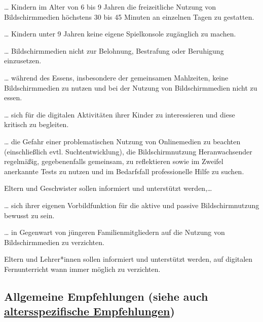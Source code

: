 \documentclass[
  letterpaper,
  DIV=11]{scrartcl}
\begin{document}
\ldots{} Kindern im Alter von 6 bis 9 Jahren die freizeitliche Nutzung
von Bildschirmmedien höchstens 30 bis 45 Minuten an einzelnen Tagen zu
gestatten.

\ldots{} Kindern unter 9 Jahren keine eigene Spielkonsole zugänglich zu
machen.

\ldots{} Bildschirmmedien nicht zur Belohnung, Bestrafung oder
Beruhigung einzusetzen.

\ldots{} während des Essens, insbesondere der gemeinsamen Mahlzeiten,
keine Bildschirmmedien zu nutzen und bei der Nutzung von
Bildschirmmedien nicht zu essen.

\ldots{} sich für die digitalen Aktivitäten ihrer Kinder zu
interessieren und diese kritisch zu begleiten.

\ldots{} die Gefahr einer problematischen Nutzung von Onlinemedien zu
beachten (einschließlich evtl. Suchtentwicklung), die Bildschirmnutzung
Heranwachsender regelmäßig, gegebenenfalls gemeinsam, zu reflektieren
sowie im Zweifel anerkannte Tests zu nutzen und im Bedarfsfall
professionelle Hilfe zu suchen.

Eltern und Geschwister sollen informiert und unterstützt werden,\ldots{}

\ldots{} sich ihrer eigenen Vorbildfunktion für die aktive und passive
Bildschirmnutzung bewusst zu sein.

\ldots{} in Gegenwart von jüngeren Familienmitgliedern auf die Nutzung
von Bildschirmmedien zu verzichten.

Eltern und Lehrer*innen sollen informiert und unterstützt werden, auf
digitalen Fernunterricht wann immer möglich zu verzichten.

\hypertarget{allgemeine-empfehlungen-siehe-auch-altersspezifische-empfehlungen}{%
\subsection{\texorpdfstring{Allgemeine Empfehlungen (siehe auch
\protect\hyperlink{altersspezifische-empfehlungen}{altersspezifische
Empfehlungen})}{Allgemeine Empfehlungen (siehe auch altersspezifische Empfehlungen)}}\label{allgemeine-empfehlungen-siehe-auch-altersspezifische-empfehlungen}}
\end{document}
